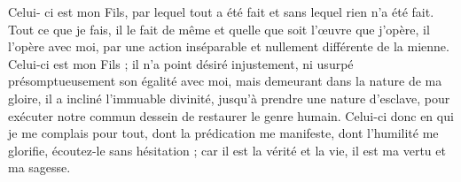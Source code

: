 Celui- ci est mon Fils, par lequel tout a été fait et sans lequel rien n’a été fait. Tout ce que je fais, il le fait de même et quelle que soit l’œuvre que j’opère, il l’opère avec moi, par une action inséparable et nullement différente de la mienne. Celui-ci est mon Fils ; il n’a point désiré injustement, ni usurpé présomptueusement son égalité avec moi, mais demeurant dans la nature de ma gloire, il a incliné l’immuable divinité, jusqu’à prendre une nature d’esclave, pour exécuter notre commun dessein de restaurer le genre humain. Celui-ci donc en qui je me complais pour tout, dont la prédication me manifeste, dont l’humilité me glorifie, écoutez-le sans hésitation ; car il est la vérité et la vie, il est ma vertu et ma sagesse.
